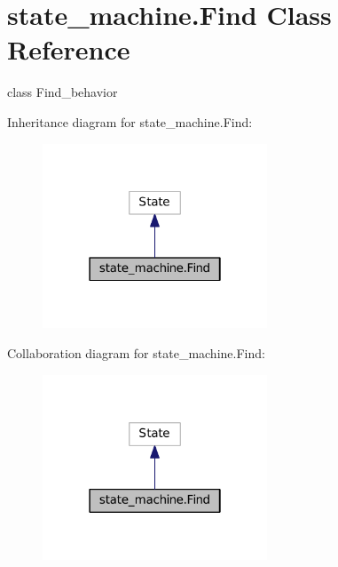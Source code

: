 \hypertarget{classstate__machine_1_1Find}{}\section{state\+\_\+machine.\+Find Class Reference}
\label{classstate__machine_1_1Find}


class Find\+\_\+behavior  




Inheritance diagram for state\+\_\+machine.\+Find\+:
\nopagebreak
\begin{figure}[H]
\begin{center}
\leavevmode
\includegraphics[width=190pt]{classstate__machine_1_1Find__inherit__graph}
\end{center}
\end{figure}


Collaboration diagram for state\+\_\+machine.\+Find\+:
\nopagebreak
\begin{figure}[H]
\begin{center}
\leavevmode
\includegraphics[width=190pt]{classstate__machine_1_1Find__coll__graph}
\end{center}
\end{figure}
